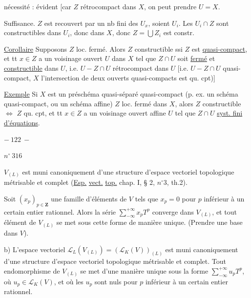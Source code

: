 nécessité : évident [car $Z$ rétrocompact dans $X$, 
 on peut prendre $U=X$.

Suffisance. $Z$ est recouvert par un nb fini des $U_x$, soient $U_i$.
Les $U_i\cap Z$ sont constructibles dans $U_i$, donc dans $X$,
donc $Z=\bigcup Z_i$ est constr.

\uline{Corollaire} Supposons $Z$ loc. fermé.
Alors $Z$  constructible
ssi $Z$ est \uline{quasi-compact}, et tt $x\in Z$ a un voisinage ouvert
$U$ dans $X$ tel que $Z\cap U$ soit \uline{fermé} et
\uline{constructible} dans $U$, i.e. $U-Z\cap U$ rétrocompact dans $U$
[i.e. $U-Z\cap U$ quasi-compact,
 $X$ l'intersection de deux ouverts quasi-compacts
est qu. cpt)]

\uline{Exemple} Si $X$ est un préschéma quasi-séparé quasi-compact
(p. ex. un schéma quasi-compact, ou un schéma affine) 
$Z$ loc. fermé dans $X$, alors $Z$ constructible $\Longleftrightarrow$
$Z$ qu. cpt, et tt $x\in Z$ a un voisinage ouvert affine $U$ tel que
$Z\cap U$  \uline{syst. fini} \uline{d'équations}.


\begin{center}$-\ 122\ -$\end{center}
\begin{flushright}$n^{\circ}\ 316$\end{flushright}
$V_{(L)}$ est muni canoniquement d'une structure d'espace vectoriel topologique
métrisable et complet (\uline{Esp.} \uline{vect.} \uline{top.} chap. I, § 2, $n^{\circ}3$, th.2).

Soit $(x_p)_{p\in\mathbf Z}$ une famille d'éléments de $V$ tels que $x_p=0$
pour $p$ inférieur à un certain entier rationnel.
Alors la série $\sum_{-\infty}^{+\infty}x_pT^p$ converge dans $V_{(L)}$,
et tout élément de $V_{(L)}$ se met sous cette forme de manière unique.
(Prendre une base dans $V$).

b) L'espace vectoriel $\mathcal L_L(V_{(L)})=(\mathcal L_K(V))_{(L)}$
est muni canoniquement d'une structure d'espace vectoriel topologique métrisable et complet.
Tout endomorphisme de $V_{(L)}$ se met d'une manière unique sous la forme
$\sum_{-\infty}^{+\infty}u_pT^p$, où $u_p\in\mathcal L_K(V)$,
et où les $u_p$ sont nuls pour $p$ inférieur à un certain entier rationnel.


